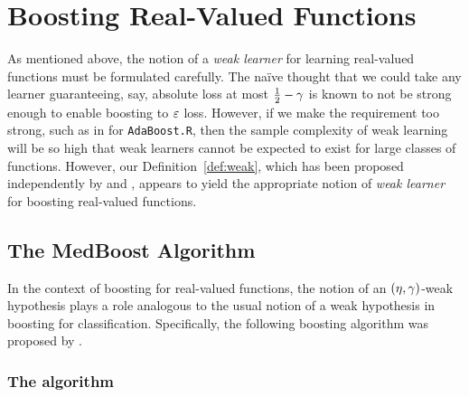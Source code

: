 \chapter{Boosting Real-Valued Functions}
\label{subsec:real-boosting}

As mentioned above, the notion of a \emph{weak learner} for learning real-valued functions must be formulated carefully.
The na\"{i}ve thought that we could take any learner guaranteeing, say, absolute loss at most $\frac{1}{2}-\gamma$ 
is known to not be strong enough to enable boosting to $\varepsilon$ loss.  However, if we make the requirement too strong, 
such as in
\citet{FreundSchapire97}
for
{\tt AdaBoost.R},
then the sample complexity of weak learning will be so high that weak learners cannot 
be expected to exist for large classes of functions.  %
However,
our Definition~\ref{def:weak},
which has been proposed independently by \citet{DBLP:journals/siamcomp/Simon97} and \citet{kegl2003robust},
appears to yield the appropriate notion of \emph{weak learner} for boosting real-valued functions.

    
    


\section{The MedBoost Algorithm}

In the context of boosting for real-valued functions, 
the notion of an $(\eta,\gamma)$-weak hypothesis plays a role analogous to 
the usual notion of a weak hypothesis in boosting for classification.
Specifically, the following boosting algorithm was proposed by \citet{kegl2003robust}.

\subsection{The algorithm}

